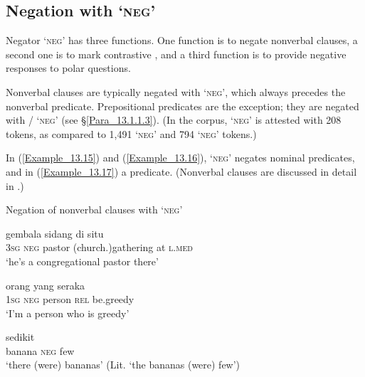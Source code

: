 \subsection{Negation with  ‘\textsc{neg}’}
\label{Para_13.1.2}
Negator  ‘\textsc{neg}’ has three functions. One function is to negate nonverbal clauses, a second one is to mark contrastive , and a third function is to provide negative responses to polar questions.



Nonverbal clauses are typically negated with  ‘\textsc{neg}’, which always precedes the nonverbal predicate. Prepositional predicates are the exception; they are negated with / ‘\textsc{neg}’ (see §\ref{Para_13.1.1.3}). (In the corpus,  ‘\textsc{neg}’ is attested with 208 tokens, as compared to 1,491  ‘\textsc{neg}’ and 794  ‘\textsc{neg}’ tokens.)



In (\ref{Example_13.15}) and (\ref{Example_13.16}),  ‘\textsc{neg}’ negates nominal predicates, and in (\ref{Example_13.17}) a  predicate. (Nonverbal clauses are discussed in detail in .)


\begin{styleExampleTitle}
Negation of nonverbal clauses with  ‘\textsc{neg}’
\end{styleExampleTitle}

\ea
\label{Example_13.15}
 {} {gembala} {sidang} {di} {situ}\\ %
 \textsc{3sg}  \textsc{neg}  pastor  (church.)gathering  at  \textsc{l.med}\\
\glt 
‘he’s  a congregational pastor there’ \textstyleExampleSource{[080925-003-Cv.0032]}
\z

\ea
\label{Example_13.16}
 {} {orang} {yang} {seraka}\\ %
 \textsc{1sg}  \textsc{neg}  person  \textsc{rel}  be.greedy\\
\glt 
‘I’m  a person who is greedy’ \textstyleExampleSource{[080917-010-CvEx.0214]}
\z

\ea
\label{Example_13.17}
 {} {sedikit}\\ %
 banana  \textsc{neg}  few\\
\glt 
‘there (were)  bananas’ (Lit. ‘the bananas (were)  few’) \textstyleExampleSource{[080925-003-Cv.0158]}
\z


